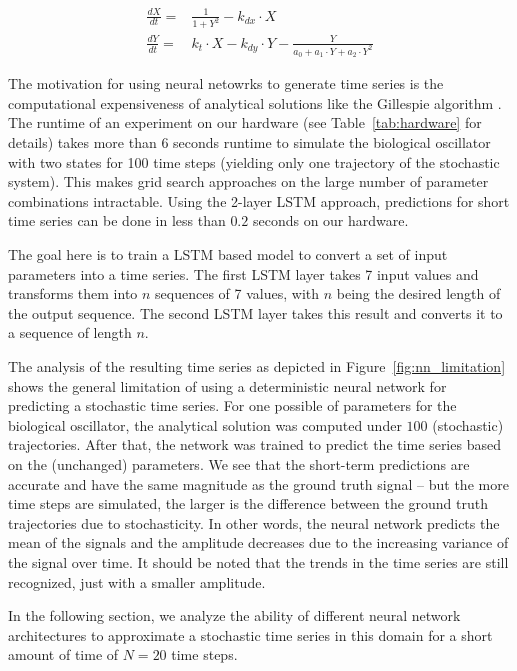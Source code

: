 \documentclass{article}
\begin{document}
\begin{align}
  \frac{dX}{dt} = & \frac{1}{1+Y^2} - k_{dx} \cdot X \\
  \frac{dY}{dt} = & k_t \cdot X - k_{dy} \cdot Y - \frac{Y}{a_0 + a_1 \cdot Y + a_2 \cdot Y^2}
  \label{equ:oscillator}
\end{align}

The motivation for using neural netowrks to generate time series is the
computational expensiveness of analytical solutions like the Gillespie
algorithm \cite{gillespie1977}. The runtime of an experiment on our hardware
(see Table~\ref{tab:hardware} for details)
takes more than 6 seconds runtime to simulate the biological oscillator with two
states for 100 time steps (yielding only one trajectory of the stochastic 
system). This makes grid search approaches on the large number
of parameter
combinations intractable. Using the 2-layer LSTM approach, predictions for
short time series can be done in less than $0.2$ seconds on our hardware.

The goal here is to train a LSTM based
model to convert a set of input parameters into a time series. The first
LSTM layer
takes 7 input values and transforms them into $n$ sequences of 7 values, with
$n$ being the desired length of the output sequence. The second LSTM layer
takes this result and converts it to a sequence of length $n$.

The analysis of the resulting time series as depicted in
Figure~\ref{fig:nn_limitation} shows the general limitation of using a
deterministic neural network for predicting a stochastic time series. For one
possible of parameters for the biological oscillator, the analytical solution
was computed under $100$ (stochastic) trajectories. After that, the network was
trained to predict the time series based on the (unchanged) parameters. We see
that the short-term predictions are accurate and have the same magnitude as the
ground truth signal -- but the more time steps are simulated, the larger is the
difference between the ground truth trajectories due to stochasticity. In other
words, the neural network predicts the mean of the signals and the amplitude
decreases due to the increasing variance of the signal over time.
It should be noted that the trends in the time series are still
recognized, just with a smaller amplitude.

In the following section, we analyze the ability of different neural network
architectures to approximate a stochastic time series in this domain for a short
amount of time of $N=20$ time steps.
\end{document}
